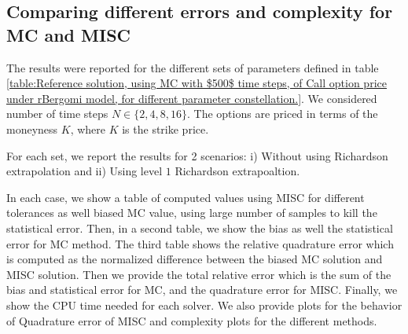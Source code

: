 \documentclass[11pt]{article}
\newcommand{\expt}[1]{\mathrm{E}\left[#1\right]}
\begin{document}
%	
%
%
%


\subsection{Comparing different  errors and complexity for MC and MISC}\label{sec:Comparing different  errors and complexity for MC and MISC}


The results were reported for the different sets of parameters defined in table \ref{table:Reference solution, using MC with $500$ time steps, of Call option price under rBergomi model, for different parameter constellation.}. We considered   number of time steps $N \in \{2,4,8,16\}$.  The options are priced in terms of the moneyness $K$, where $K$ is the strike price.   

 For each set,  we report the results for 2 scenarios: i) Without using Richardson extrapolation and  ii) Using level $1$ Richardson extrapoaltion.

In each case, we show a table of computed values using MISC for different tolerances as well biased MC value, using large number of samples to kill the statistical error. Then, in a second table,  we show the bias as well the statistical error for MC method. The third table shows the relative quadrature error which is computed as the normalized difference between the biased MC solution and MISC solution. Then we provide the total relative error which is the sum of the bias and statistical error for MC, and the quadrature error for MISC. Finally, we show the CPU time needed for each solver. We also provide plots for the behavior of Quadrature error of MISC and complexity plots for the different methods. 
\end{document}
